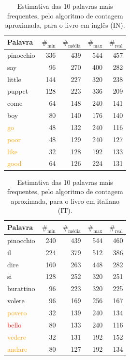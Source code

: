 \documentclass[mirror, portugues]{revdetua}
\begin{document}
\begin{table}[H]
\centering
\caption{Estimativa das 10 palavras mais frequentes, pelo algoritmo de contagem aproximada, para o livro em inglês (IN).}
\label{table:top10_aprox_ingles}
\begin{tabular}{lrrr|r}
\toprule
Palavra & $\text{\#}_{\text{min}}$ & $\text{\#}_{\text{média}}$ & $\text{\#}_{\text{max}}$ & $\text{\#}_{\text{real}}$ \\
\midrule
pinocchio & 336 & 439 & 544 & 457 \\
say & 96 & 270 & 400 & 282 \\
little & 144 & 227 & 320 & 238 \\
puppet & 128 & 223 & 336 & 209 \\
come & 64 & 148 & 240 & 141 \\
boy & 80 & 140 & 176 & 140 \\
\textcolor{orange}{go} & 48 & 132 & 240 & 116 \\
\textcolor{orange}{poor} & 48 & 129 & 240 & 127 \\
\textcolor{orange}{like} & 32 & 128 & 192 & 133 \\
\textcolor{orange}{good} & 64 & 126 & 224 & 131 \\
\bottomrule
\end{tabular}
\end{table}

\begin{table}[H]
\centering
\caption{Estimativa das 10 palavras mais frequentes, pelo algoritmo de contagem aproximada, para o livro em italiano (IT).}
\label{table:top10_aprox_italiano}
\begin{tabular}{lrrr|r}
\toprule
Palavra & $\text{\#}_{\text{min}}$ & $\text{\#}_{\text{média}}$ & $\text{\#}_{\text{max}}$ & $\text{\#}_{\text{real}}$ \\
\midrule
pinocchio & 240 & 439 & 544 & 460 \\
il & 224 & 379 & 512 & 386 \\
dire & 160 & 263 & 448 & 282 \\
si & 128 & 252 & 320 & 251 \\
burattino & 96 & 223 & 320 & 225 \\
volere & 96 & 169 & 256 & 167 \\
\textcolor{orange}{povero} & 32 & 139 & 240 & 134 \\
\textcolor{red}{bello} & 80 & 133 & 240 & 116 \\
\textcolor{orange}{vedere} & 32 & 131 & 192 & 152 \\
\textcolor{orange}{andare} & 80 & 127 & 192 & 134 \\
\bottomrule
\end{tabular}
\end{table}
\end{document}

